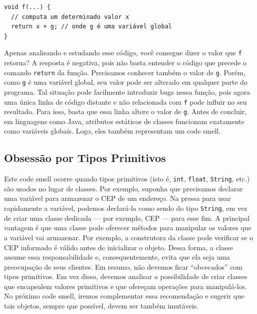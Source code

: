 \documentclass[
  11pt,
  twoside]{book}
\newcommand{\passthrough}[1]{#1}
\begin{document}
\begin{lstlisting}
void f(...) {
  // computa um determinado valor x
  return x + g; // onde g é uma variável global
}
\end{lstlisting}

Apenas analisando e estudando esse código, você consegue dizer o valor
que \passthrough{\lstinline!f!} retorna? A resposta é negativa, pois não
basta entender o código que precede o comando
\passthrough{\lstinline!return!} da função. Precisamos conhecer também o
valor de \passthrough{\lstinline!g!}. Porém, como
\passthrough{\lstinline!g!} é uma variável global, seu valor pode ser
alterado em qualquer parte do programa. Tal situação pode facilmente
introduzir bugs nessa função, pois agora uma única linha de código
distante e não relacionada com \passthrough{\lstinline!f!} pode influir
no seu resultado. Para isso, basta que essa linha altere o valor de
\passthrough{\lstinline!g!}. Antes de concluir, em linguagens como Java,
atributos estáticos de classes funcionam exatamente como variáveis
globais. Logo, eles também representam um code smell.

\hypertarget{obsessuxe3o-por-tipos-primitivos}{%
\subsection{Obsessão por Tipos
Primitivos}\label{obsessuxe3o-por-tipos-primitivos}}


Este code smell ocorre quando tipos primitivos (isto é,
\passthrough{\lstinline!int!}, \passthrough{\lstinline!float!},
\passthrough{\lstinline!String!}, etc.) são usados no lugar de classes.
Por exemplo, suponha que precisamos declarar uma variável para armazenar
o CEP de um endereço. Na pressa para usar rapidamente a variável,
podemos declará-la como sendo do tipo \passthrough{\lstinline!String!},
em vez de criar uma classe dedicada --- por exemplo, CEP --- para esse
fim. A principal vantagem é que uma classe pode oferecer métodos para
manipular os valores que a variável vai armazenar. Por exemplo, a
construtora da classe pode verificar se o CEP informado é válido antes
de inicializar o objeto. Dessa forma, a classe assume essa
responsabilidade e, consequentemente, evita que ela seja uma preocupação
de seus clientes. Em resumo, não devemos ficar ``obcecados'' com tipos
primitivos. Em vez disso, devemos analisar a possibilidade de criar
classes que encapsulem valores primitivos e que ofereçam operações para
manipulá-los. No próximo code smell, iremos complementar essa
recomendação e sugerir que tais objetos, sempre que possível, devem ser
também imutáveis.
\end{document}
